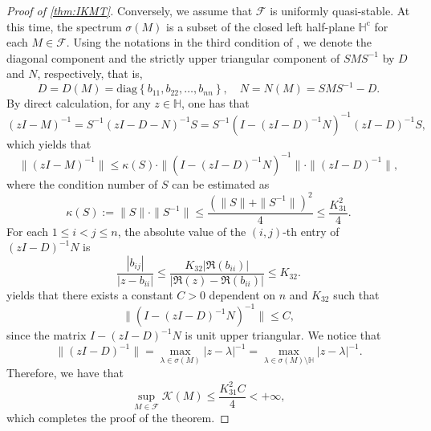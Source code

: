\documentclass{article}
\theoremstyle{plain}%
\theoremstyle{definition}%
\theoremstyle{remark}%
\newcommand{\bH}{\mathbb{H}}
\newcommand{\cF}{\mathcal{F}}
\newcommand{\cK}{\mathcal{K}}
\newcommand{\rc}{\mathrm{c}}
\newcommand{\+}[1]{{\bm{#1}}}
\newcommand{\diag}{\mathrm{diag}}
\newcommand{\norm}[1]{\|{#1}\|}
\begin{document}
\begin{proof}[Proof of \cref{thm:IKMT}]
  Conversely, we assume that $\cF$ is uniformly quasi-stable. At this 
  time, the spectrum $\sigma(M)$ is a subset of the closed left 
  half-plane $\bH^\rc$ for each $M \in \cF$. 
  Using the notations in the third 
  condition of , we denote the diagonal component and 
  the strictly upper triangular component of $S M S^{-1}$ by $D$ and 
  $N$, respectively, that is, 
  \begin{displaymath}
    D = D(M) = \diag \left\{ b_{11}, b_{22}, \ldots, b_{nn} \right\},
    \quad N = N(M) = S M S^{-1} - D.
  \end{displaymath}
  By direct calculation, for any $z \in \bH$, one has that 
  \begin{displaymath}
    (z I - M)^{-1} = S^{-1} (z I - D - N)^{-1} S = 
    S^{-1} \left( I - (z I - D)^{-1} N \right)^{-1} (z I - D)^{-1} S,
  \end{displaymath}
  which yields that 
  \begin{displaymath}
    \norm{(z I - M)^{-1}} \le \kappa(S) \cdot 
    \norm{\left( I - (z I - D)^{-1} N \right)^{-1}} \cdot 
    \norm{(z I - D)^{-1}},
  \end{displaymath}
  where the condition number of $S$ can be estimated as 
  \begin{displaymath}
    \kappa(S) := \norm{S} \cdot \norm{S^{-1}} \le 
    \frac{\left( \norm{S} + \norm{S^{-1}} \right)^2}{4} \le 
    \frac{K_{31}^2}{4}.
  \end{displaymath}
  For each $1 \le i < j \le n$, the absolute value of the $(i,j)$-th 
  entry of $(z I - D)^{-1} N$ is 
  \begin{equation}\label{equ:entry_estimate}
    \frac{|b_{ij}|}{|z - b_{ii}|} \le 
    \frac{K_{32} |\Re(b_{ii})|}{|\Re(z) - \Re(b_{ii})|} \le K_{32}.
  \end{equation}
   yields that there exists a constant $C > 0$ 
  dependent on $n$ and $K_{32}$ such that 
  \begin{displaymath}
    \norm{\left( I - (z I - D)^{-1} N \right)^{-1}} \le C,
  \end{displaymath}
  since the matrix $I - (z I - D)^{-1} N$ is unit upper triangular.
  We notice that 
  \begin{displaymath}
    \norm{(z I - D)^{-1}} = \max_{\lambda \in \sigma(M)} 
    |z - \lambda|^{-1} = 
    \max_{\lambda \in \sigma(M) \setminus \bH} 
    |z - \lambda|^{-1}.
  \end{displaymath}
  Therefore, we have that 
  \begin{displaymath}
    \sup_{M \in \cF} \cK(M) \le \frac{K_{31}^2 C}{4} < + \infty,
  \end{displaymath}
  which completes the proof of the theorem.
\end{proof}
\end{document}
